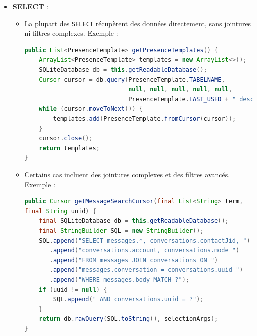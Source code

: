 \documentclass[a4paper,11pt]{article}
\begin{document}
\begin{itemize}
    \item \textbf{SELECT} :
    \begin{itemize}
        \item La plupart des \texttt{SELECT} récupèrent des données directement, sans jointures ni filtres complexes. Exemple :
        \begin{lstlisting}[language=Java]
public List<PresenceTemplate> getPresenceTemplates() {
    ArrayList<PresenceTemplate> templates = new ArrayList<>();
    SQLiteDatabase db = this.getReadableDatabase();
    Cursor cursor = db.query(PresenceTemplate.TABELNAME, 
                             null, null, null, null, null, 
                             PresenceTemplate.LAST_USED + " desc");
    while (cursor.moveToNext()) {
        templates.add(PresenceTemplate.fromCursor(cursor));
    }
    cursor.close();
    return templates;
}
        \end{lstlisting}
        \item Certains cas incluent des jointures complexes et des filtres avancés. Exemple :
        \begin{lstlisting}[language=Java]
public Cursor getMessageSearchCursor(final List<String> term,
final String uuid) {
    final SQLiteDatabase db = this.getReadableDatabase();
    final StringBuilder SQL = new StringBuilder();
    SQL.append("SELECT messages.*, conversations.contactJid, ")
       .append("conversations.account, conversations.mode ")
       .append("FROM messages JOIN conversations ON ")
       .append("messages.conversation = conversations.uuid ")
       .append("WHERE messages.body MATCH ?");
    if (uuid != null) {
        SQL.append(" AND conversations.uuid = ?");
    }
    return db.rawQuery(SQL.toString(), selectionArgs);
}
        \end{lstlisting}
    \end{itemize}
    

\end{itemize}
\end{document}
